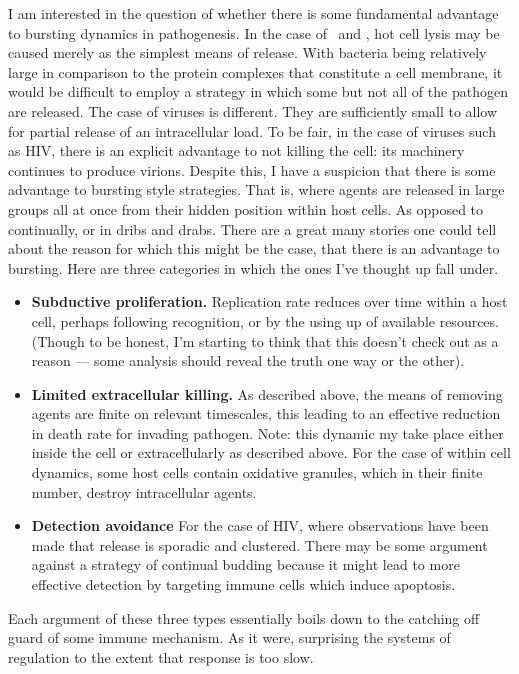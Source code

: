 I am interested in the question of whether there is some fundamental advantage to bursting dynamics in pathogenesis. In the case of \ft \, and \yp, hot cell lysis may be caused merely as the simplest means of release. With bacteria being relatively large in comparison to the protein complexes that constitute a cell membrane, it would be difficult to employ a strategy in which some but not all of the pathogen are released. The case of viruses is different. They are sufficiently small to allow for partial release of an intracellular load. To be fair, in the case of viruses such as HIV, there is an explicit advantage to not killing the cell: its machinery continues to produce virions. Despite this, I have a suspicion that there is some advantage to bursting style strategies. That is, where agents are released in large groups all at once from their hidden position within host cells. As opposed to continually, or in dribs and drabs. There are a great many stories one could tell about the reason for which this might be the case, that there is an advantage to bursting. Here are three categories in which the ones I've thought up fall under. 

\begin{itemize}
\item \textbf{Subductive proliferation.} Replication rate reduces over time within a host cell, perhaps following recognition, or by the using up of available resources. (Though to be honest, I'm starting to think that this doesn't check out as a reason --- some analysis should reveal the truth one way or the other).
\item  \textbf{Limited extracellular killing.} As described above, the means of removing agents are finite on relevant timescales, this leading to an effective reduction in death rate for invading pathogen. Note: this dynamic my take place either inside the cell or extracellularly as described above. For the case of within cell dynamics, some host cells contain oxidative granules, which in their finite number, destroy intracellular agents.  
\item \textbf{Detection avoidance}
For the case of HIV, where observations have been made that release is sporadic and clustered. There may be some argument against a strategy of continual budding because it might lead to more effective detection by targeting immune cells which induce apoptosis. 
\end{itemize}
Each argument of these three types essentially boils down to the catching off guard of some immune mechanism. As it were, surprising the systems of regulation to the extent that response is too slow. 



